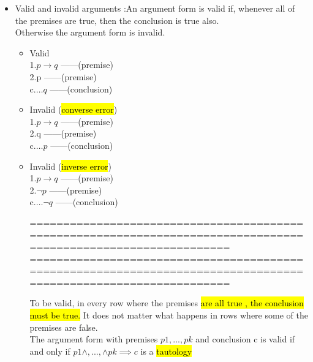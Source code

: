 \documentclass{article}
\begin{document}
\begin{itemize}

\item Valid and invalid arguments :An argument form is valid if, whenever all of the premises are true, then
the conclusion is true also.\\
Otherwise the argument form is invalid.

\begin{itemize}
\item Valid\\
1.$p \rightarrow q$   ------(premise)\\
2.p ------(premise)\\
c.$\ldots q$ ------(conclusion)


\item Invalid (\hl{converse error})\\
1.$p \rightarrow q$   ------(premise)\\
2.q ------(premise)\\
c.$\ldots p$ ------(conclusion)


\item Invalid (\hl{inverse error})\\
1.$p \rightarrow q$   ------(premise)\\
2.$\neg p$ ------(premise)\\
c.$\ldots \neg q$ ------(conclusion)

================================================================================================================
\newpage
================================================================================================================

To be valid, in every row where the premises \hl{are all true , the conclusion must be true.}
It does not matter what happens in rows where some of the premises are false.\\
The argument form with premises $p1, . . . , pk$ and conclusion c
is valid if and only if $p1 \land, . . . , \land pk \implies c$ is a \hl{tautology}
\end{itemize}


\end{itemize}
\end{document}
